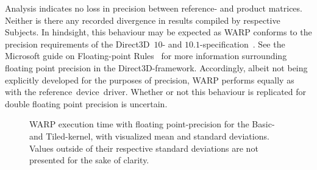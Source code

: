 Analysis indicates no loss in precision between reference- and product matrices.
Neither is there any recorded divergence in results compiled by respective Subjects.
In hindsight, this behaviour may be expected as WARP conforms to the precision requirements of the Direct3D~$10$- and $10.1$-specification~.
See the Microsoft guide on Floating-point Rules~ for more information surrounding floating point precision in the Direct3D-framework.
Accordingly, albeit not being explicitly developed for the purposes of precision, WARP performs equally as with the reference~device~driver.
Whether or not this behaviour is replicated for double floating point precision is uncertain.

\begin{figure}[htb]
\begin{center}
	\resizebox{ \columnwidth }{!}{}
	\caption{WARP execution time with floating point-precision for the Basic- and Tiled-kernel, with visualized mean and standard deviations. Values outside of their respective standard deviations are not presented for the sake of clarity.}
	\label{fig:contribution:results:warp:msswarp}
\end{center}
\end{figure}
